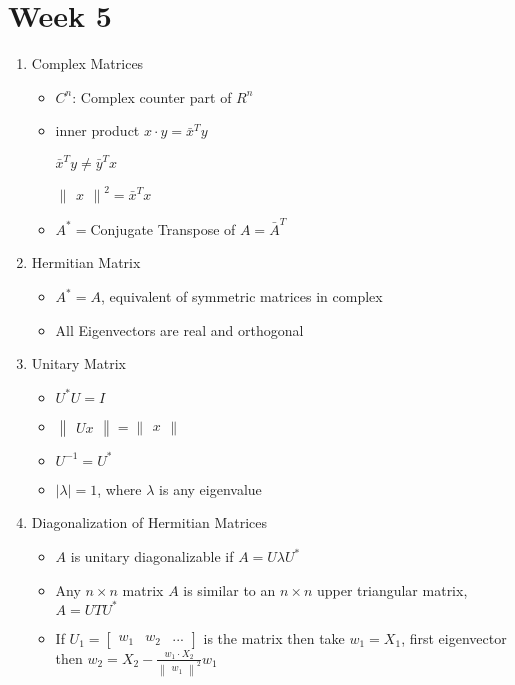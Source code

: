 \documentclass[a4paper]{article}
\begin{document}
\section{Week 5}
	\begin{enumerate}
		\item Complex Matrices
		\begin{itemize}
			\item $C^{n}$: Complex counter part of $R^{n}$
			\item inner product $x\cdot y = \bar{x}^{T}y$
			
			$\bar{x}^{T}y \neq \bar{y}^{T}x$
			
			$\begin{Vmatrix}x\end{Vmatrix}^{2} = \bar{x}^{T}x$
			\item $A^{*} = $Conjugate Transpose of $A = \bar{A}^{T}$
		\end{itemize}
		\item Hermitian Matrix
		\begin{itemize}
			\item $A^{*} = A$, equivalent of symmetric matrices in complex
			\item All Eigenvectors are real and orthogonal
		\end{itemize}
		\item Unitary Matrix
		\begin{itemize}
			\item $U^{*}U = I$
			\item $\begin{Vmatrix}Ux\end{Vmatrix} = \begin{Vmatrix}x\end{Vmatrix}$
			\item $U^{-1} = U^{*}$
			\item $|\lambda | = 1$, where $\lambda$ is any eigenvalue
		\end{itemize}
		\item Diagonalization of Hermitian Matrices
		\begin{itemize}
			\item $A$ is unitary diagonalizable if $A = U\lambda U^{*}$
			\item Any $n\times n$ matrix $A$ is similar to an $n\times n$ upper triangular matrix, $A = UTU^{*}$
			\item If $U_{1} = \begin{bmatrix}w_{1}&w_{2}&...\end{bmatrix}$ is the matrix then take $w_{1} = X_{1}$, first eigenvector then $w_{2} = X_{2} - \frac{w_{1}\cdot X_{2}}{\begin{Vmatrix}w_{1}\end{Vmatrix}^{2}}w_{1}$ 
		\end{itemize}
	\end{enumerate}
\end{document}
